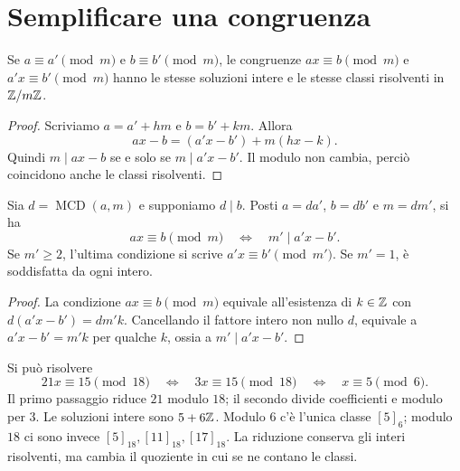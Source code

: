 \begin{schema}
\end{schema}

\section{Semplificare una congruenza}
\begin{proposizione}
Se $a\equiv a'\pmod m$ e $b\equiv b'\pmod m$, le congruenze $ax\equiv b\pmod m$ e $a'x\equiv b'\pmod m$ hanno le stesse soluzioni intere e le stesse classi risolventi in $\mathbb{Z}/m\mathbb{Z}$.
\end{proposizione}
\begin{proof}
Scriviamo $a=a'+hm$ e $b=b'+km$. Allora
\[
ax-b=(a'x-b')+m(hx-k).
\]
Quindi $m\mid ax-b$ se e solo se $m\mid a'x-b'$. Il modulo non cambia, perciò coincidono anche le classi risolventi.
\end{proof}

\begin{proposizione}\label{prop:riduzione-modulo}
Sia $d=\operatorname{MCD}(a,m)$ e supponiamo $d\mid b$. Posti $a=da'$, $b=db'$ e $m=dm'$, si ha
\[
ax\equiv b\pmod m\quad\Longleftrightarrow\quad
m'\mid a'x-b'.
\]
Se $m'\ge2$, l'ultima condizione si scrive $a'x\equiv b'\pmod{m'}$. Se $m'=1$, è soddisfatta da ogni intero.
\end{proposizione}
\begin{proof}
La condizione $ax\equiv b\pmod m$ equivale all'esistenza di $k\in\mathbb{Z}$ con $d(a'x-b')=dm'k$. Cancellando il fattore intero non nullo $d$, equivale a $a'x-b'=m'k$ per qualche $k$, ossia a $m'\mid a'x-b'$.
\end{proof}

\begin{esempio}
Si può risolvere
\[
21x\equiv15\pmod{18}\quad\Longleftrightarrow\quad
3x\equiv15\pmod{18}\quad\Longleftrightarrow\quad
x\equiv5\pmod6.
\]
Il primo passaggio riduce $21$ modulo $18$; il secondo divide coefficienti e modulo per $3$. Le soluzioni intere sono $5+6\mathbb{Z}$. Modulo $6$ c'è l'unica classe $[5]_6$; modulo $18$ ci sono invece $[5]_{18},[11]_{18},[17]_{18}$. La riduzione conserva gli interi risolventi, ma cambia il quoziente in cui se ne contano le classi.
\end{esempio}

